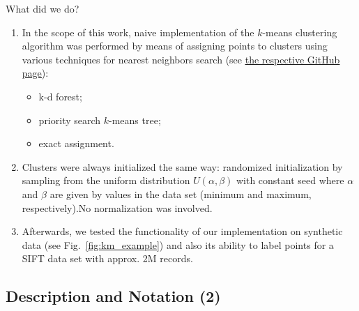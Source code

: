 \begin{frame}
	
	\begin{block}{What did we do?}
		\begin{enumerate}
			\item In the scope of this work, naive implementation of the $k$-means \cite{Lloyd1982} clustering algorithm was performed by means of assigning points to clusters using various techniques for nearest neighbors search (see \href{https://github.com/salisaresama/computer-vision/blob/master/pylib/ann/cluster.py}{{\color{blue} \underline{the respective GitHub page}}}):
			\begin{itemize}
				\item k-d forest;
				\item priority search $k$-means tree;
				\item exact assignment.
			\end{itemize}
			
			\item Clusters were always initialized the same way: randomized initialization by sampling from the uniform distribution $U(\alpha, \beta)$ with constant seed where $\alpha$ and $\beta$ are given by values in the data set (minimum and maximum, respectively).\footnotemark No normalization was involved.
			
			\item Afterwards, we tested the functionality of our implementation on synthetic data (see Fig.~\ref{fig:km_example}) and also its ability to label points for a SIFT data set with approx. 2M records.
		\end{enumerate}	

	\end{block}	

	
\end{frame}

\subsection{Description and Notation (2)}

